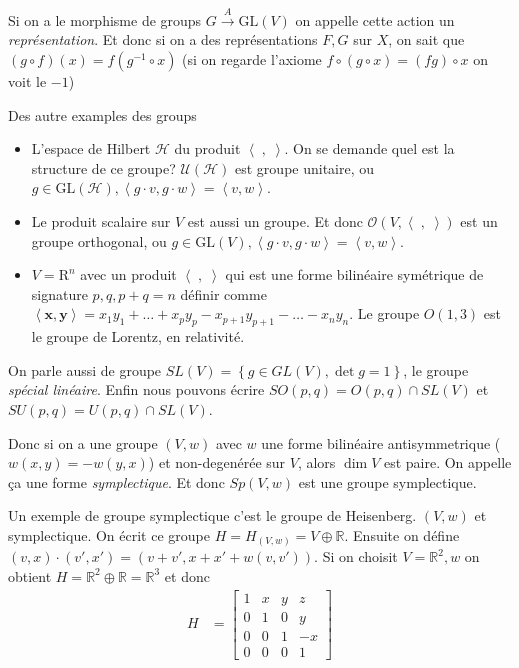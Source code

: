 \documentclass[10pt]{report}
\newcommand{\expvalue}[1]{\left<#1\right>}
\begin{document}
Si on a le morphisme de groups $G \overset{A}{\to} \mathrm{GL}(V)$ on appelle cette action un \emph{repr\'esentation}. Et donc si on a des repr\'esentations $F,G$ sur $X$, on sait que $\left(g \circ f\right)(x) = f\left(g^{-1}\circ x\right)$ (si on regarde l'axiome $f\circ\left( g\circ x \right) = \left( fg \right)\circ x$ on voit le $-1$)

Des autre examples des groups
\begin{itemize}
    \item L'espace de Hilbert $\mathcal{H}$ du produit $\left<\;,\;\right>$. On se demande quel est la structure de ce groupe? $\mathcal{U}(\mathcal{H})$ est groupe unitaire, ou $g \in \mathrm{GL}(\mathcal{H}), \expvalue{g \cdot v, g \cdot w} = \expvalue{v,w}$.
    \item Le produit scalaire sur $V$ est aussi un groupe. Et donc $\mathcal{O}\left(V,\expvalue{\;,\;}\right)$ est un groupe orthogonal, ou $g \in \mathrm{GL}(V), \expvalue{g\cdot v, g \cdot w} = \expvalue{v,w}$.
    \item $V = \mathrm{R}^n$ avec un produit $\expvalue{\;,\;}$ qui est une forme bilin\'eaire sym\'etrique de signature $p,q, p+q=n$ d\'efinir comme $\expvalue{\mathbf{x},\mathbf{y}} = x_1y_1 + \dots + x_py_p - x_{p+1}y_{p+1} - \dots - x_ny_n$. Le groupe $O(1,3)$ est le groupe de Lorentz, en relativit\'e.
\end{itemize}

On parle aussi de groupe $SL(V) = \left\{ g \in GL(V), \det g = 1 \right\}$, le groupe \emph{sp\'ecial lin\'eaire}. Enfin nous pouvons \'ecrire $SO(p,q) = O(p,q) \cap SL(V)$ et $SU(p,q) = U(p,q) \cap SL(V)$.

Donc si on a une groupe $(V,w)$ avec $w$ une forme bilin\'eaire antisymmetrique ($w(x,y) = -w(y,x)$) et non-degen\'er\'ee sur $V$, alors $\dim V$ est paire. On appelle \c{c}a une forme \emph{symplectique}. Et donc $Sp(V,w)$ est une groupe symplectique.

Un exemple de groupe symplectique c'est le groupe de Heisenberg. $(V,w)$ et symplectique. On \'ecrit ce groupe $H = H_{(V,w)} = V \oplus \mathbb{R}$. Ensuite on d\'efine $(v,x) \cdot (v',x') = (v+v', x+x' + w(v,v'))$. Si on choisit $V = \mathbb{R}^2,w$ on obtient $H = \mathbb{R}^2 \oplus \mathbb{R} = \mathbb{R}^3$ et donc
\begin{align}
    H &= \begin{bmatrix} 1 & x & y & z \\
        0 & 1 & 0 & y \\
        0 & 0 & 1 & -x \\
        0 & 0 & 0 & 1 \end{bmatrix} 
\end{align}
\end{document}
